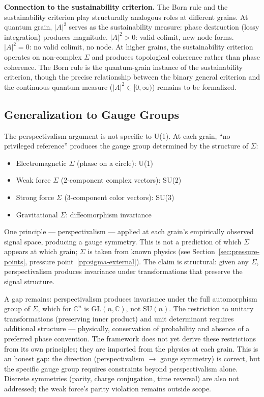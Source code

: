 \documentclass[12pt,a4paper]{article}
\begin{document}
\textbf{Connection to the sustainability criterion.} The Born rule and the sustainability criterion play structurally analogous roles at different grains. At quantum grain, $|A|^2$ serves as the sustainability measure: phase destruction (lossy integration) produces magnitude. $|A|^2 > 0$: valid colimit, new node forms. $|A|^2 = 0$: no valid colimit, no node. At higher grains, the sustainability criterion operates on non-complex $\Sigma$ and produces topological coherence rather than phase coherence. The Born rule is the quantum-grain instance of the sustainability criterion, though the precise relationship between the binary general criterion and the continuous quantum measure ($|A|^2 \in [0, \infty)$) remains to be formalized.

\subsection{Generalization to Gauge Groups}
\label{sec:gauge-groups}

The perspectivalism argument is not specific to U(1). At each grain, ``no privileged reference'' produces the gauge group determined by the structure of $\Sigma$:

\begin{itemize}
  \item Electromagnetic $\Sigma$ (phase on a circle): U(1)
  \item Weak force $\Sigma$ (2-component complex vectors): SU(2)
  \item Strong force $\Sigma$ (3-component color vectors): SU(3)
  \item Gravitational $\Sigma$: diffeomorphism invariance
\end{itemize}

One principle --- perspectivalism --- applied at each grain's empirically observed signal space, producing a gauge symmetry. This is not a prediction of which $\Sigma$ appears at which grain; $\Sigma$ is taken from known physics (see Section~\ref{sec:pressure-points}, pressure point~\ref{pp:sigma-external}). The claim is structural: given any $\Sigma$, perspectivalism produces invariance under transformations that preserve the signal structure.

A gap remains: perspectivalism produces invariance under the full automorphism group of $\Sigma$, which for $\mathbb{C}^n$ is $\text{GL}(n, \mathbb{C})$, not $\text{SU}(n)$. The restriction to unitary transformations (preserving inner product) and unit determinant requires additional structure --- physically, conservation of probability and absence of a preferred phase convention. The framework does not yet derive these restrictions from its own principles; they are imported from the physics at each grain. This is an honest gap: the direction (perspectivalism $\to$ gauge symmetry) is correct, but the specific gauge group requires constraints beyond perspectivalism alone. Discrete symmetries (parity, charge conjugation, time reversal) are also not addressed; the weak force's parity violation remains outside scope.
\end{document}
